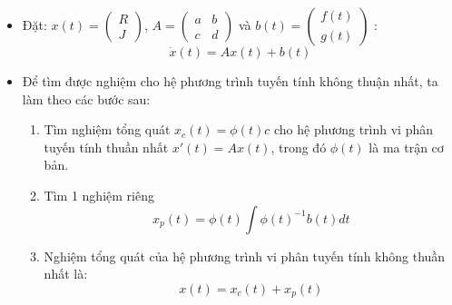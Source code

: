 \documentclass[a4paper]{article}
\begin{document}
\begin{itemize}
\item Đặt: $x(t) = \left( \begin{matrix} R \\ J \end{matrix} \right)$, $  A =  \left( \begin{matrix} a & b \\ c & d  \end{matrix} \right) $ và $ b(t) = \left( \begin{matrix} f(t) \\ g(t) \end{matrix} \right)$ :
    \begin{equation} \label{eq:26} 
        \dot{x}(t) = Ax(t) + b(t)
    \end{equation}
\item Để tìm được nghiệm cho hệ phương trình tuyến tính không thuận nhất, ta làm theo các bước sau:
    \begin{enumerate} [(1)]
    \item
        Tìm nghiệm tổng quát $x_c(t) = \phi(t)c$ cho hệ phương trình vi phân tuyến tính thuần nhất $x'(t) = Ax(t)$, trong đó $\phi(t)$ là ma trận cơ bản.
    \item
        Tìm 1 nghiệm riêng 
        \begin{equation} \label{eq:27}
        x_p(t) = \phi(t)\int\phi(t)^{-1}b(t)dt
        \end{equation}
        \item Nghiệm tổng quát của hệ phương trình vi phân tuyến tính không thuần nhất là:
        \begin{equation} \label{eq:28}
        x(t) = x_c(t) + x_p(t)
        \end{equation}
    \end{enumerate}
    

\end{itemize}
\end{document}
